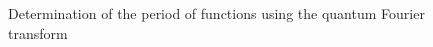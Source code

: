 \begin{figure}
\centering



\caption{Determination of the period of functions using the quantum
  Fourier transform}
\label{figQuantCompQuantPeriodFinding}
\end{figure}